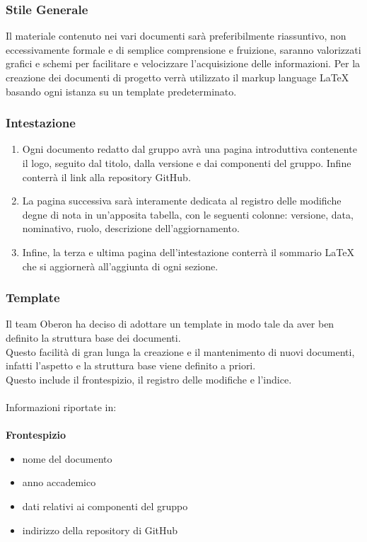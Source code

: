 \subsubsection{Stile Generale}
Il materiale contenuto nei vari documenti sarà preferibilmente riassuntivo, non eccessivamente formale e di semplice comprensione e fruizione, saranno valorizzati grafici e schemi per facilitare e velocizzare l’acquisizione delle informazioni.  \newline
Per la creazione dei documenti di progetto verrà utilizzato il markup language LaTeX basando ogni istanza su un template predeterminato.

\subsubsection{Intestazione}
\begin{enumerate}
    \item Ogni documento redatto dal gruppo avrà una pagina introduttiva contenente il logo, seguito dal titolo, dalla versione e dai componenti del gruppo. Infine conterrà il link alla repository GitHub.
    \item La pagina successiva sarà interamente dedicata al registro delle modifiche degne di nota in un’apposita tabella, con le seguenti colonne: versione, data, nominativo, ruolo, descrizione dell'aggiornamento.
    \item  Infine, la terza e ultima pagina dell'intestazione conterrà il sommario LaTeX che si aggiornerà all'aggiunta di ogni sezione.
\end{enumerate}

\subsubsection{Template}
Il team Oberon ha deciso di adottare un template in modo tale da aver ben definito la struttura base dei documenti.\\
Questo facilità di gran lunga la creazione e il mantenimento di nuovi documenti, infatti l'aspetto e la struttura base viene definito a priori.\\
Questo include il frontespizio, il registro delle modifiche e l'indice.\\\\
Informazioni riportate in:
\\\\
\textbf{Frontespizio}
\begin{itemize}
\setlength\itemsep{0em}
    \item nome del documento
    \item anno accademico
    \item dati relativi ai componenti del gruppo
    \item indirizzo della repository di GitHub
\end{itemize}

